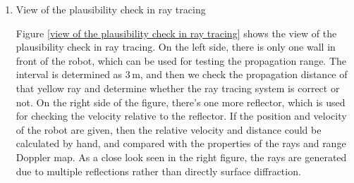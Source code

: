 \documentclass[12pt,DIV14,BCOR12mm,a4paper,footinclude=false,headinclude,parskip=half-,twoside,openright,cleardoublepage=empty,toc=index,bibliography=totoc,listof=totoc]{scrreprt}
\numberwithin{equation}{chapter}
\begin{document}
\begin{enumerate}[label=\textbullet]
    \item View of the plausibility check in ray tracing

    Figure \ref{view of the plausibility check in ray tracing} shows the view of the plausibility check in ray tracing. On the left side, there is only one wall in front of the robot, which can be used for testing the propagation range. The interval is determined as $3\,\mathrm{m}$, and then we check the propagation distance of that yellow ray and determine whether the ray tracing system is correct or not. On the right side of the figure, there's one more reflector, which is used for checking the velocity relative to the reflector. If the position and velocity of the robot are given, then the relative velocity and distance could be calculated by hand, and compared with the properties of the rays and range Doppler map. As a close look seen in the right figure, the rays are generated due to multiple reflections rather than directly surface diffraction.


\end{enumerate}
\end{document}
